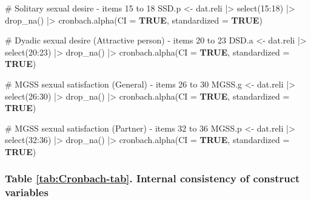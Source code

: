 \documentclass[
  bookmarksnumbered]{article}
\newenvironment{Shaded}{\begin{snugshade}}{\end{snugshade}}
\newcommand{\AttributeTok}[1]{\textcolor[rgb]{0.80,0.80,0.80}{#1}}
\newcommand{\CommentTok}[1]{\textcolor[rgb]{0.50,0.62,0.50}{#1}}
\newcommand{\ConstantTok}[1]{\textcolor[rgb]{0.86,0.64,0.64}{\textbf{#1}}}
\newcommand{\DecValTok}[1]{\textcolor[rgb]{0.86,0.86,0.80}{#1}}
\newcommand{\FunctionTok}[1]{\textcolor[rgb]{0.94,0.94,0.56}{#1}}
\newcommand{\NormalTok}[1]{\textcolor[rgb]{0.80,0.80,0.80}{#1}}
\newcommand{\OtherTok}[1]{\textcolor[rgb]{0.94,0.94,0.56}{#1}}
\newcommand{\SpecialCharTok}[1]{\textcolor[rgb]{0.86,0.64,0.64}{#1}}
\begin{document}
\begin{Shaded}
\begin{Highlighting}[]
\CommentTok{\# Solitary sexual desire {-} items 15 to 18}
\NormalTok{SSD.p }\OtherTok{\textless{}{-}}\NormalTok{ dat.reli }\SpecialCharTok{|\textgreater{}}
  \FunctionTok{select}\NormalTok{(}\DecValTok{15}\SpecialCharTok{:}\DecValTok{18}\NormalTok{) }\SpecialCharTok{|\textgreater{}}
  \FunctionTok{drop\_na}\NormalTok{() }\SpecialCharTok{|\textgreater{}}
  \FunctionTok{cronbach.alpha}\NormalTok{(}\AttributeTok{CI =} \ConstantTok{TRUE}\NormalTok{, }\AttributeTok{standardized =} \ConstantTok{TRUE}\NormalTok{)}

\CommentTok{\# Dyadic sexual desire (Attractive person) {-} items 20 to 23}
\NormalTok{DSD.a }\OtherTok{\textless{}{-}}\NormalTok{ dat.reli }\SpecialCharTok{|\textgreater{}}
  \FunctionTok{select}\NormalTok{(}\DecValTok{20}\SpecialCharTok{:}\DecValTok{23}\NormalTok{) }\SpecialCharTok{|\textgreater{}}
  \FunctionTok{drop\_na}\NormalTok{() }\SpecialCharTok{|\textgreater{}}
  \FunctionTok{cronbach.alpha}\NormalTok{(}\AttributeTok{CI =} \ConstantTok{TRUE}\NormalTok{, }\AttributeTok{standardized =} \ConstantTok{TRUE}\NormalTok{)}

\CommentTok{\# MGSS sexual satisfaction (General) {-} items 26 to 30}
\NormalTok{MGSS.g }\OtherTok{\textless{}{-}}\NormalTok{ dat.reli }\SpecialCharTok{|\textgreater{}}
  \FunctionTok{select}\NormalTok{(}\DecValTok{26}\SpecialCharTok{:}\DecValTok{30}\NormalTok{) }\SpecialCharTok{|\textgreater{}}
  \FunctionTok{drop\_na}\NormalTok{() }\SpecialCharTok{|\textgreater{}}
  \FunctionTok{cronbach.alpha}\NormalTok{(}\AttributeTok{CI =} \ConstantTok{TRUE}\NormalTok{, }\AttributeTok{standardized =} \ConstantTok{TRUE}\NormalTok{)}

\CommentTok{\# MGSS sexual satisfaction (Partner) {-} items 32 to 36}
\NormalTok{MGSS.p }\OtherTok{\textless{}{-}}\NormalTok{ dat.reli }\SpecialCharTok{|\textgreater{}}
  \FunctionTok{select}\NormalTok{(}\DecValTok{32}\SpecialCharTok{:}\DecValTok{36}\NormalTok{) }\SpecialCharTok{|\textgreater{}}
  \FunctionTok{drop\_na}\NormalTok{() }\SpecialCharTok{|\textgreater{}}
  \FunctionTok{cronbach.alpha}\NormalTok{(}\AttributeTok{CI =} \ConstantTok{TRUE}\NormalTok{, }\AttributeTok{standardized =} \ConstantTok{TRUE}\NormalTok{)}
\end{Highlighting}
\end{Shaded}

\subsubsection{Table \ref{tab:Cronbach-tab}. Internal consistency of construct variables}\label{table-reftabcronbach-tab.-internal-consistency-of-construct-variables}
\end{document}
